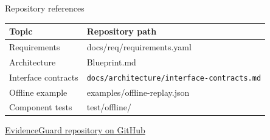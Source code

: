 \documentclass[aspectratio=169,11pt,t]{beamer}
\newcommand{\code}[1]{{\ttfamily\small #1}}
\begin{document}

\appendix
\begin{frame}{Repository references}
 \small
 \begin{tabularx}{\textwidth}{@{}L{.32\textwidth}Y@{}}
 \toprule Topic & Repository path\\\midrule
 Requirements & \code{docs/req/requirements.yaml}\\[6pt]
 Architecture & \code{Blueprint.md}\\[6pt]
 Interface contracts & \nolinkurl{docs/architecture/interface-contracts.md}\\[6pt]
 Offline example & \code{examples/offline-replay.json}\\[6pt]
 Component tests & \code{test/offline/}\\\bottomrule
 \end{tabularx}
 \par\medskip
 \href{https://github.com/Djangle162857/evidenceguard-tradingagents-cs5351/tree/codex/evidenceguard-candidate}{EvidenceGuard repository on GitHub}
\end{frame}
\end{document}
